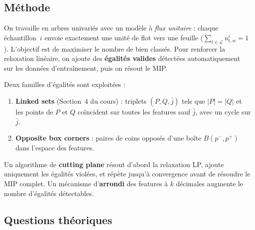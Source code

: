 \documentclass[a4paper,10pt,titlepage,leqno]{article}
\begin{document}
\subsection{Méthode}

On travaille en arbres univariés avec un modèle à \emph{flux unitaire} : chaque échantillon~$i$ envoie exactement une unité de flot vers une feuille ($\sum_{t \in \mathcal{L}} u^i_{t,w} = 1$). L'objectif est de maximiser le nombre de bien classés. Pour renforcer la relaxation linéaire, on ajoute des \textbf{égalités valides} détectées automatiquement sur les données d'entraînement, puis on résout le MIP.

Deux familles d'égalités sont exploitées :

\begin{enumerate}
  \item \textbf{Linked sets} (Section~4 du cours) : triplets $(P, Q, \bar{j})$ tels que $|P|=|Q|$ et les points de $P$ et $Q$ coïncident sur toutes les features sauf $\bar{j}$, avec un cycle sur $\bar{j}$.
  \item \textbf{Opposite box corners} : paires de coins opposés d'une boîte $B(p^-, p^+)$ dans l'espace des features.
\end{enumerate}

Un algorithme de \textbf{cutting plane} résout d'abord la relaxation LP, ajoute uniquement les égalités violées, et répète jusqu'à convergence avant de résoudre le MIP complet. Un mécanisme d'\textbf{arrondi} des features à $k$ décimales augmente le nombre d'égalités détectables.

\subsection{Questions théoriques}
\end{document}
